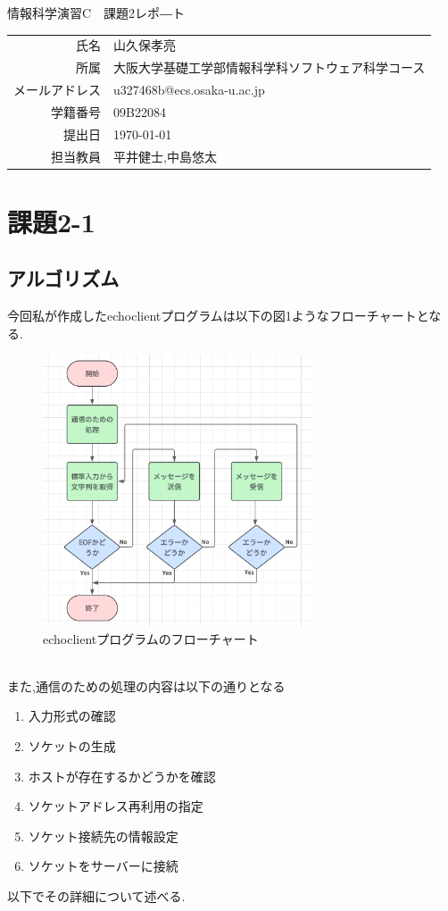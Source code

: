 \documentclass[dvipdfmx]{jarticle}
\begin{document}
\begin{titlepage}
    \begin{center}
        {\huge 情報科学演習C　課題2レポ―ト}
        \vspace{180pt}\\
        \begin{tabular}{rl}
            氏名 & 山久保孝亮\\
            所属 & 大阪大学基礎工学部情報科学科ソフトウェア科学コース\\
            メールアドレス & u327468b@ecs.osaka-u.ac.jp\\
            学籍番号 & 09B22084\\
            提出日 & \today\\
            担当教員 & 平井健士,中島悠太
        \end{tabular}
    \end{center}
\end{titlepage}
\section{課題2-1}
\subsection{アルゴリズム}
今回私が作成したechoclientプログラムは以下の図1ようなフローチャートとなる.
\begin{figure}[h]
    \center
    \includegraphics[width=8cm]{hurotya1.png}
    \caption{echoclientプログラムのフローチャート}
\end{figure}
\\また,通信のための処理の内容は以下の通りとなる
\begin{enumerate}
    \item 入力形式の確認
    \item ソケットの生成
    \item ホストが存在するかどうかを確認
    \item ソケットアドレス再利用の指定
    \item ソケット接続先の情報設定
    \item ソケットをサーバーに接続
\end{enumerate}
以下でその詳細について述べる.
\end{document}
